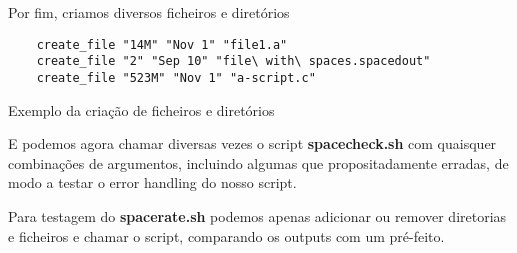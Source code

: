 Por fim, criamos diversos ficheiros e diretórios
\begin{listing}[H]
\begin{verbatim}
    create_file "14M" "Nov 1" "file1.a"
    create_file "2" "Sep 10" "file\ with\ spaces.spacedout"
    create_file "523M" "Nov 1" "a-script.c"
\end{verbatim}
\caption{Exemplo da criação de ficheiros e diretórios}
\end{listing}
E podemos agora chamar diversas vezes o script \textbf{spacecheck.sh} com quaisquer combinações de argumentos, incluindo
algumas que propositadamente erradas, de modo a testar o error handling do nosso script.

Para testagem do \textbf{spacerate.sh} podemos apenas adicionar ou remover diretorias e ficheiros e chamar o script,
comparando os outputs com um pré-feito.
